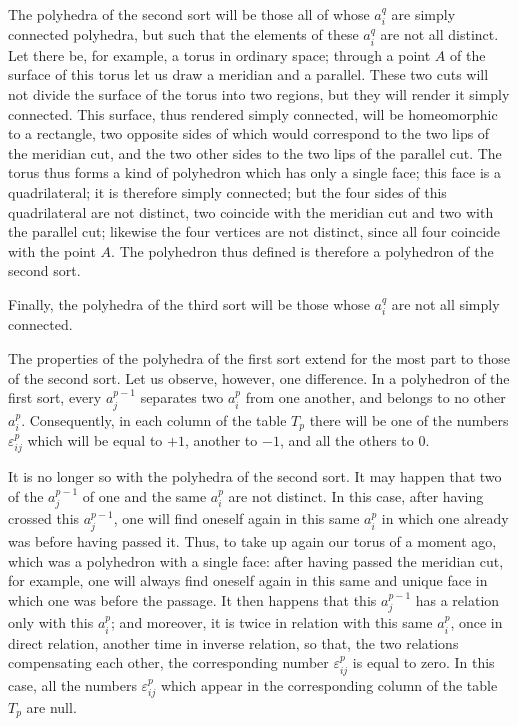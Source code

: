 \documentclass{article}
\begin{document}
The polyhedra of the second sort will be those all of whose $a^{q}_{i}$ are simply connected polyhedra, but such that the elements of these $a^{q}_{i}$ are not all distinct. Let there be, for example, a torus in ordinary space; through a point $A$ of the surface of this torus let us draw a meridian and a parallel. These two cuts will not divide the surface of the torus into two regions, but they will render it simply connected. This surface, thus rendered simply connected, will be homeomorphic to a rectangle, two opposite sides of which would correspond to the two lips of the meridian cut, and the two other sides to the two lips of the parallel cut. The torus thus forms a kind of polyhedron which has only a single face; this face is a quadrilateral; it is therefore simply connected; but the four sides of this quadrilateral are not distinct, two coincide with the meridian cut and two with the parallel cut; likewise the four vertices are not distinct, since all four coincide with the point $A$. The polyhedron thus defined is therefore a polyhedron of the second sort.

Finally, the polyhedra of the third sort will be those whose $a^{q}_{i}$ are not all simply connected.

The properties of the polyhedra of the first sort extend for the most part to those of the second sort. Let us observe, however, one difference. In a polyhedron of the first sort, every $a^{p-1}_{j}$ separates two $a^{p}_{i}$ from one another, and belongs to no other $a^{p}_{i}$. Consequently, in each column of the table $T_{p}$ there will be one of the numbers $\varepsilon^{p}_{ij}$ which will be equal to $+1$, another to $-1$, and all the others to 0.

It is no longer so with the polyhedra of the second sort. It may happen that two of the $a^{p-1}_{j}$ of one and the same $a^{p}_{i}$ are not distinct. In this case, after having crossed this $a^{p-1}_{j}$, one will find oneself again in this same $a^{p}_{i}$ in which one already was before having passed it. Thus, to take up again our torus of a moment ago, which was a polyhedron with a single face: after having passed the meridian cut, for example, one will always find oneself again in this same and unique face in which one was before the passage. It then happens that this $a^{p-1}_{j}$ has a relation only with this $a^{p}_{i}$; and moreover, it is twice in relation with this same $a^{p}_{i}$, once in direct relation, another time in inverse relation, so that, the two relations compensating each other, the corresponding number $\varepsilon^{p}_{ij}$ is equal to zero. In this case, all the numbers $\varepsilon^{p}_{ij}$ which appear in the corresponding column of the table $T_{p}$ are null.
\end{document}
